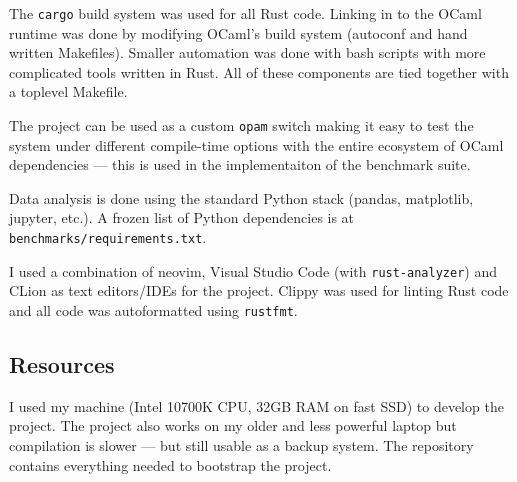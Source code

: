 
The \texttt{cargo} build system was used for all Rust code. Linking in to the OCaml runtime was
done by modifying OCaml's build system (autoconf and hand written Makefiles). Smaller automation
was done with bash scripts with more complicated tools written in Rust.  All of these components
are tied together with a toplevel Makefile.

The project can be used as a custom \texttt{opam} switch making it easy to test the system under
different compile-time options with the entire ecosystem of OCaml dependencies --- this is used in
the implementaiton of the benchmark suite.

Data analysis is done using the standard Python stack (pandas, matplotlib, jupyter, etc.). A frozen
list of Python dependencies is at \texttt{benchmarks/requirements.txt}.

I used a combination of neovim, Visual Studio Code (with \texttt{rust-analyzer}) and CLion as text
editors/IDEs for the project.  Clippy was used for linting Rust code and all code was autoformatted
using \texttt{rustfmt}.

\subsection{Resources}

I used my machine (Intel 10700K CPU, 32GB RAM on fast SSD) to develop the project. The project also
works on my older and less powerful laptop but compilation is slower --- but still usable as a
backup system. The repository contains everything needed to bootstrap the project.